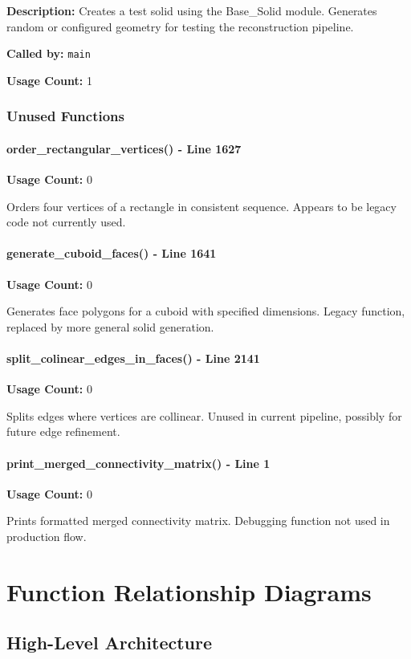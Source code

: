 \documentclass[11pt,a4paper]{article}
\begin{document}
\textbf{Description:}
Creates a test solid using the Base\_Solid module. Generates random or configured geometry for testing the reconstruction pipeline.

\textbf{Called by:} \texttt{main}

\textbf{Usage Count:} 1

\subsubsection{Unused Functions}

\paragraph{order\_rectangular\_vertices() - Line 1627}
\textbf{Usage Count:} 0

Orders four vertices of a rectangle in consistent sequence. Appears to be legacy code not currently used.

\paragraph{generate\_cuboid\_faces() - Line 1641}
\textbf{Usage Count:} 0

Generates face polygons for a cuboid with specified dimensions. Legacy function, replaced by more general solid generation.

\paragraph{split\_colinear\_edges\_in\_faces() - Line 2141}
\textbf{Usage Count:} 0

Splits edges where vertices are collinear. Unused in current pipeline, possibly for future edge refinement.

\paragraph{print\_merged\_connectivity\_matrix() - Line 1}
\textbf{Usage Count:} 0

Prints formatted merged connectivity matrix. Debugging function not used in production flow.

\newpage
\section{Function Relationship Diagrams}

\subsection{High-Level Architecture}
\end{document}
